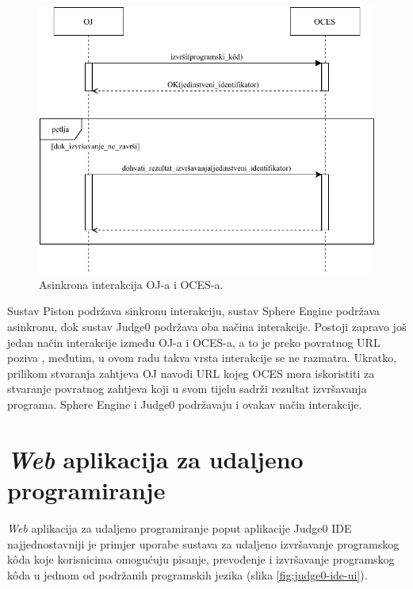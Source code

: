 \documentclass[times, utf8, diplomski]{fer}
\begin{document}
\begin{figure}[htb]
	\centering
	\includegraphics[width=\textwidth]{images/Async Interakcija.pdf}
	\caption{
		Asinkrona interakcija OJ-a i OCES-a.
	}
	\label{fig:async-interaction}
\end{figure}

Sustav Piston podržava sinkronu interakciju, sustav Sphere Engine podržava asinkronu, dok sustav Judge0 podržava oba načina interakcije. Postoji zapravo još jedan način interakcije između OJ-a i OCES-a, a to je preko povratnog URL poziva , međutim, u ovom radu takva vrsta interakcije se ne razmatra. Ukratko, prilikom stvaranja zahtjeva OJ navodi URL kojeg OCES mora iskoristiti za stvaranje povratnog zahtjeva koji u svom tijelu  sadrži rezultat izvršavanja programa. Sphere Engine i Judge0 podržavaju i ovakav način interakcije.

\section{\textit{Web} aplikacija za udaljeno programiranje}
\textit{Web} aplikacija za udaljeno programiranje poput aplikacije Judge0 IDE \citep{Judge0IDE} najjednostavniji je primjer uporabe sustava za udaljeno izvršavanje programskog kôda koje korisnicima omogućuju pisanje, prevođenje i izvršavanje programskog kôda u jednom od podržanih programskih jezika (slika \ref{fig:judge0-ide-ui}).
\end{document}
